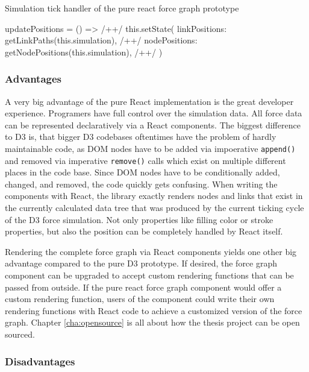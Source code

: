 \begin{program}
\caption{Simulation tick handler of the pure react force graph prototype}
\label{prog:pureReactTickHandler}
\begin{JsCode}
updatePositions = () => { /+\label{line:updatePositions}+/
  this.setState({
    linkPositions: getLinkPaths(this.simulation), /+\label{line:getLinkPositions}+/
    nodePositions: getNodePositions(this.simulation), /+\label{line:getNodePositions}+/
  })
}
\end{JsCode}
\end{program}

\subsubsection{Advantages}


A very big advantage of the pure React implementation is the great developer experience. Programers have full control over the simulation data. All force data can be represented declaratively via a React components. The biggest difference to D3 is, that bigger D3 codebases oftentimes have the problem of hardly maintainable code, as DOM nodes have to be added via impoerative \texttt{append()} and removed via imperative \texttt{remove()} calls which exist on multiple different places in the code base. Since DOM nodes have to be conditionally added, changed, and removed, the code quickly gets confusing. When writing the components with React, the library exactly renders nodes and links that exist in the currently calculated data tree that was produced by the current ticking cycle of the D3 force simulation. Not only properties like filling color or stroke properties, but also the position can be completely handled by React itself.

Rendering the complete force graph via React components yields one other big advantage compared to the pure D3 prototype. If desired, the force graph component can be upgraded to accept custom rendering functions that can be passed from outside. If the pure react force graph component would offer a custom rendering function, users of the component could write their own rendering functions with React code to achieve a customized version of the force graph. Chapter \ref{cha:opensource} is all about how the thesis project can be open sourced.

\subsubsection{Disadvantages}

